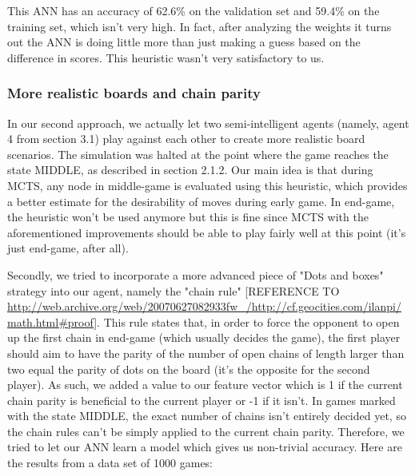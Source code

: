 This ANN has an accuracy of 62.6\% on the validation set and 59.4\% on the training set, which isn't very high. In fact, after analyzing the weights it turns out the ANN is doing little more than just making a guess based on the difference in scores. This heuristic wasn't very satisfactory to us.

\subsubsection{More realistic boards and chain parity}

In our second approach, we actually let two semi-intelligent agents (namely, agent 4 from section 3.1) play against each other to create more realistic board scenarios. The simulation was halted at the point where the game reaches the state MIDDLE, as described in section 2.1.2. Our main idea is that during MCTS, any node in middle-game is evaluated using this heuristic, which provides a better estimate for the desirability of moves during early game. In end-game, the heuristic won't be used anymore but this is fine since MCTS with the aforementioned improvements should be able to play fairly well at this point (it's just end-game, after all).

	Secondly, we tried to incorporate a more advanced piece of "Dots and boxes" strategy into our agent, namely the "chain rule" [REFERENCE TO \url{http://web.archive.org/web/20070627082933fw_/http://cf.geocities.com/ilanpi/math.html#proof}]. This rule states that, in order to force the opponent to open up the first chain in end-game (which usually decides the game), the first player should aim to have the parity of the number of open chains of length larger than two equal the parity of dots on the board (it's the opposite for the second player). As such, we added a value to our feature vector which is 1 if the current chain parity is beneficial to the current player or -1 if it isn't. In games marked with the state MIDDLE, the exact number of chains isn't entirely decided yet, so the chain rules can't be simply applied to the current chain parity. Therefore, we tried to let our ANN learn a model which gives us non-trivial accuracy. Here are the results from a data set of 1000 games:
	
